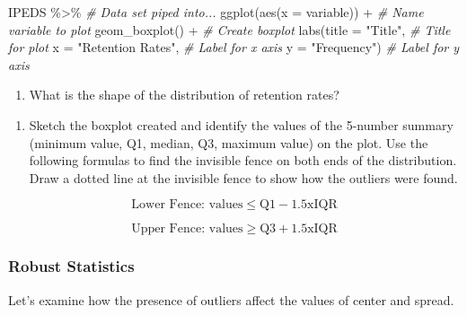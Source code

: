\documentclass[
]{report}
\newenvironment{Shaded}{\begin{snugshade}}{\end{snugshade}}
\newcommand{\AttributeTok}[1]{\textcolor[rgb]{0.77,0.63,0.00}{#1}}
\newcommand{\CommentTok}[1]{\textcolor[rgb]{0.56,0.35,0.01}{\textit{#1}}}
\newcommand{\FunctionTok}[1]{\textcolor[rgb]{0.00,0.00,0.00}{#1}}
\newcommand{\NormalTok}[1]{#1}
\newcommand{\SpecialCharTok}[1]{\textcolor[rgb]{0.00,0.00,0.00}{#1}}
\newcommand{\StringTok}[1]{\textcolor[rgb]{0.31,0.60,0.02}{#1}}
\providecommand{\tightlist}{%
  \setlength{\itemsep}{0pt}\setlength{\parskip}{0pt}}
\begin{document}
\begin{Shaded}
\begin{Highlighting}[]
\NormalTok{IPEDS }\SpecialCharTok{\%\textgreater{}\%} \CommentTok{\# Data set piped into...}
\FunctionTok{ggplot}\NormalTok{(}\FunctionTok{aes}\NormalTok{(}\AttributeTok{x =}\NormalTok{ variable)) }\SpecialCharTok{+}   \CommentTok{\# Name variable to plot}
  \FunctionTok{geom\_boxplot}\NormalTok{() }\SpecialCharTok{+}  \CommentTok{\# Create boxplot }
  \FunctionTok{labs}\NormalTok{(}\AttributeTok{title =} \StringTok{"Title"}\NormalTok{, }\CommentTok{\# Title for plot}
       \AttributeTok{x =} \StringTok{"Retention Rates"}\NormalTok{, }\CommentTok{\# Label for x axis}
       \AttributeTok{y =} \StringTok{"Frequency"}\NormalTok{) }\CommentTok{\# Label for y axis}
\end{Highlighting}
\end{Shaded}

\begin{enumerate}
\def\labelenumi{\arabic{enumi}.}
\setcounter{enumi}{5}
\tightlist
\item
  What is the shape of the distribution of retention rates?
\end{enumerate}

\newpage

\begin{enumerate}
\def\labelenumi{\arabic{enumi}.}
\setcounter{enumi}{6}
\tightlist
\item
  Sketch the boxplot created and identify the values of the 5-number summary (minimum value, Q1, median, Q3, maximum value) on the plot. Use the following formulas to find the invisible fence on both ends of the distribution. Draw a dotted line at the invisible fence to show how the outliers were found.
\end{enumerate}

\[\text{Lower Fence: values} \le \text{Q}1 - 1.5\text{x}\text{IQR}\]

\[\text{Upper Fence: values} \ge \text{Q}3 + 1.5\text{x}\text{IQR}\]
\vspace{1.5in}

\hypertarget{robust-statistics}{%
\subsubsection*{Robust Statistics}\label{robust-statistics}}

Let's examine how the presence of outliers affect the values of center and spread.
\end{document}
